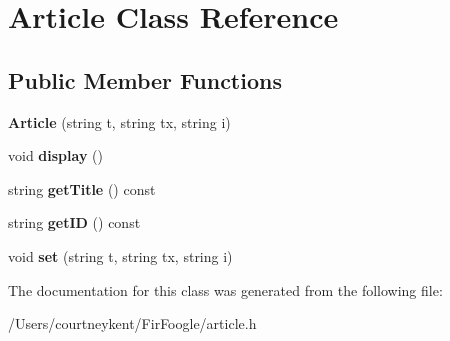 \hypertarget{class_article}{\section{Article Class Reference}
\label{class_article}
}
\subsection*{Public Member Functions}
\begin{DoxyCompactItemize}
\item 
\hypertarget{class_article_a4eabc84d9c2de1487d9e5e20eb83fcb5}{{\bfseries Article} (string t, string tx, string i)}\label{class_article_a4eabc84d9c2de1487d9e5e20eb83fcb5}

\item 
\hypertarget{class_article_ace9af28f0c1cdfc5e5fc6fed4c06a927}{void {\bfseries display} ()}\label{class_article_ace9af28f0c1cdfc5e5fc6fed4c06a927}

\item 
\hypertarget{class_article_a4aba30ca3d799734828f5d00f440706b}{string {\bfseries get\+Title} () const }\label{class_article_a4aba30ca3d799734828f5d00f440706b}

\item 
\hypertarget{class_article_a14e7b2ae85d04af1f65b6352ca98531e}{string {\bfseries get\+I\+D} () const }\label{class_article_a14e7b2ae85d04af1f65b6352ca98531e}

\item 
\hypertarget{class_article_a74017e8ce22dfc8d9ab2a193bd7747f1}{void {\bfseries set} (string t, string tx, string i)}\label{class_article_a74017e8ce22dfc8d9ab2a193bd7747f1}

\end{DoxyCompactItemize}


The documentation for this class was generated from the following file\+:\begin{DoxyCompactItemize}
\item 
/\+Users/courtneykent/\+Fir\+Foogle/article.\+h\end{DoxyCompactItemize}
